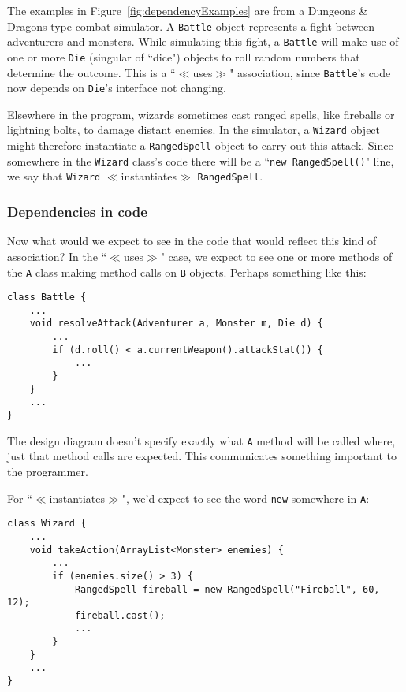 The examples in Figure~\ref{fig:dependencyExamples} are from a Dungeons \&
Dragons type combat simulator. A \texttt{Battle} object represents a fight
between adventurers and monsters. While simulating this fight, a
\texttt{Battle} will make use of one or more \texttt{Die} (singular of ``dice")
objects to roll random numbers that determine the outcome. This is a
``$\ll$uses$\gg$" association, since \texttt{Battle}'s code now depends on
\texttt{Die}'s interface not changing.

Elsewhere in the program, wizards sometimes cast ranged spells, like fireballs
or lightning bolts, to damage distant enemies. In the simulator, a
\texttt{Wizard} object might therefore instantiate a \texttt{RangedSpell}
object to carry out this attack. Since somewhere in the \texttt{Wizard} class's
code there will be a ``\texttt{new RangedSpell()}" line, we say that
\texttt{Wizard} $\ll$instantiates$\gg$ \texttt{RangedSpell}.

\subsubsection{Dependencies in code}

Now what would we expect to see in the code that would reflect this kind of
association? In the ``$\ll$uses$\gg$" case, we expect to see one or more
methods of the \texttt{A} class making method calls on \texttt{B} objects.
Perhaps something like this:

\begin{Verbatim}[fontsize=\scriptsize,samepage=true,frame=single]
class Battle {
    ...
    void resolveAttack(Adventurer a, Monster m, Die d) {
        ...
        if (d.roll() < a.currentWeapon().attackStat()) {
            ...
        }
    }
    ...
}
\end{Verbatim}

The design diagram doesn't specify exactly what \texttt{A} method will be
called where, just that method calls are expected. This communicates something
important to the programmer.

For ``$\ll$instantiates$\gg$", we'd expect to see the word \texttt{new}
somewhere in \texttt{A}:

\begin{Verbatim}[fontsize=\scriptsize,samepage=true,frame=single]
class Wizard {
    ...
    void takeAction(ArrayList<Monster> enemies) {
        ...
        if (enemies.size() > 3) {
            RangedSpell fireball = new RangedSpell("Fireball", 60, 12);
            fireball.cast();
            ...
        }
    }
    ...
}
\end{Verbatim}

